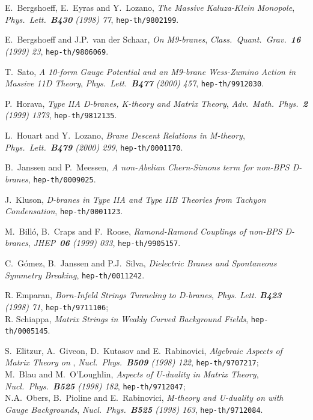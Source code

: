 \documentclass[12pt,a4paper]{article}
\begin{document}
\begin{thebibliography}{99}
E.~Bergshoeff, E.~Eyras and Y.~Lozano, {\sl The Massive 
Kaluza-Klein Monopole}, {\it Phys.~Lett.~{\bf B430} (1998) 77},
{\tt hep-th/9802199}.

E.~Bergshoeff and J.P.~van der Schaar, {\sl On M9-branes},
{\it Class.~Quant.~Grav.~{\bf 16} (1999) 23},
{\tt hep-th/9806069}.

T.~Sato, {\sl A 10-form Gauge Potential and an M9-brane Wess-Zumino
Action in Massive 11D Theory}, {\it Phys.~Lett.~{\bf B477} (2000) 457},
{\tt hep-th/9912030}.

P.~Horava, {\sl Type IIA D-branes, K-theory and Matrix Theory},
{\it Adv.~Math.~Phys.~{\bf 2} (1999) 1373}, {\tt hep-th/9812135}.

L.~Houart and Y.~Lozano, {\sl Brane Descent Relations in M-theory},
{\it Phys.~Lett.~{\bf B479} (2000) 299}, {\tt hep-th/0001170}.

B.~Janssen and P.~Meessen, {\sl A non-Abelian Chern-Simons term for 
non-BPS D-branes}, {\tt hep-th/0009025}.

J.~Kluson, {\sl D-branes in Type IIA and Type IIB Theories from
Tachyon Condensation}, {\tt hep-th/0001123}.

M.~Bill\'o, B.~Craps and F.~Roose, {\sl Ramond-Ramond Couplings
of non-BPS D-branes}, {\it JHEP~{\bf 06} (1999)
033}, {\tt hep-th/9905157}.

C.~G\'omez, B.~Janssen and P.J.~Silva, {\sl Dielectric Branes and
Spontaneous Symmetry Breaking}, {\tt hep-th/0011242}.

R. Emparan, {\sl Born-Infeld Strings Tunneling to D-branes},
{\it Phys. Lett. {\bf B423} (1998) 71}, {\tt hep-th/9711106};\\
R. Schiappa, {\sl Matrix Strings in Weakly Curved Background Fields},
{\tt hep-th/0005145}.

S.~Elitzur, A.~Giveon, D.~Kutasov and E.~Rabinovici, {\sl Algebraic
Aspects of Matrix Theory on \coordHE{}}, {\it Nucl.~Phys.~{\bf B509}
(1998) 122}, {\tt hep-th/9707217};\\
M.~Blau and M.~O'Loughlin, {\sl Aspects of U-duality in Matrix Theory},
{\it Nucl.~Phys.~{\bf B525} (1998) 182}, {\tt hep-th/9712047};\\
N.A.~Obers, B.~Pioline and E.~Rabinovici, {\sl M-theory and U-duality
on \coordHE{} with Gauge Backgrounds}, {\it Nucl.~Phys.~{\bf B525} (1998)
163}, {\tt hep-th/9712084}.


\end{thebibliography}
\end{document}
